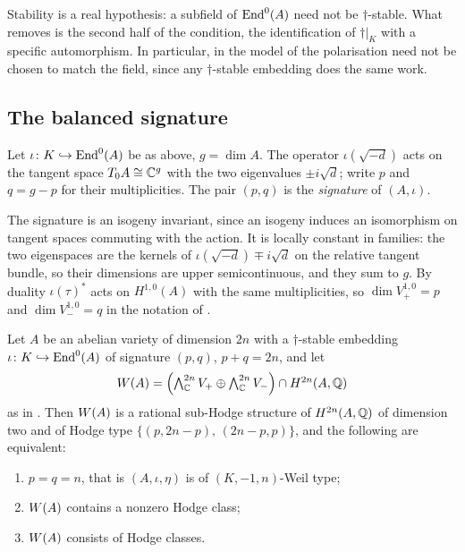 \begin{remark}\label{rem:whystable}
Stability is a real hypothesis: a subfield of $\operatorname{End}^{0}(A)$ need not be
$\dagger$-stable. What  removes is the second half of the
condition, the identification of $\dagger|_{K}$ with a specific automorphism.
In particular, in the model of  the polarisation need not be
chosen to match the field, since any $\dagger$-stable embedding does the same
work.
\end{remark}

\subsection{The balanced signature}

\begin{definition}[Signature]\label{def:signature}
Let $\iota\colon K\hookrightarrow\operatorname{End}^{0}(A)$ be as above, $g=\dim A$. The
operator $\iota(\sqrt{-d})$ acts on the tangent space $T_{0}A\cong\mathbb{C}^{g}$ with
the two eigenvalues $\pm i\sqrt{d}$; write $p$ and $q=g-p$ for their
multiplicities. The pair $(p,q)$ is the \emph{signature} of $(A,\iota)$.
\end{definition}

The signature is an isogeny invariant, since an isogeny induces an isomorphism
on tangent spaces commuting with the action. It is locally constant in
families: the two eigenspaces are the kernels of
$\iota(\sqrt{-d})\mp i\sqrt{d}$ on the relative tangent bundle, so their
dimensions are upper semicontinuous, and they sum to $g$. By
duality $\iota(\tau)^{*}$ acts on $H^{1,0}(A)$ with the same multiplicities, so
$\dim V^{1,0}_{+}=p$ and $\dim V^{1,0}_{-}=q$ in the notation of
.

\begin{proposition}\label{prop:signatureforced}
Let $A$ be an abelian variety of dimension $2n$ with a $\dagger$-stable
embedding $\iota\colon K\hookrightarrow\operatorname{End}^{0}(A)$ of signature $(p,q)$,
$p+q=2n$, and let
\[
  W(A)=\Bigl(\textstyle\bigwedge^{2n}_{\mathbb{C}}V_{+}
   \oplus\bigwedge^{2n}_{\mathbb{C}}V_{-}\Bigr)\cap H^{2n}(A,\mathbb{Q})
\]
as in . Then $W(A)$ is a rational sub-Hodge structure of
$H^{2n}(A,\mathbb{Q})$ of dimension two and of Hodge type
$\{(p,2n-p),\,(2n-p,p)\}$, and the following are equivalent:
\begin{enumerate}[label=\textup{(\roman*)},nosep]
\item $p=q=n$, that is $(A,\iota,\eta)$ is of $(K,-1,n)$-Weil type;
\item $W(A)$ contains a nonzero Hodge class;
\item $W(A)$ consists of Hodge classes.
\end{enumerate}
\end{proposition}

